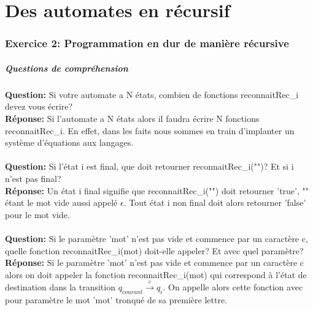 \documentclass[./standalone.tex]{subfiles}
\begin{document}
\part{Des automates en récursif}

\section{Exercice 2: Programmation en dur de manière récursive}
\bigskip

\subsubsection{Questions de compréhension}
\medskip

\textbf{Question:} Si votre automate a N états, combien de fonctions reconnaitRec\_i devez vous écrire?\\

\textbf{Réponse:} Si l'automate a N états alors il faudra écrire N fonctions reconnaitRec\_i. En effet, dans les faits nous sommes en train d'implanter un système d'équations aux langages.\\\\


\textbf{Question:} Si l'état i est final, que doit retourner reconnaitRec\_i("")? Et si i n'est pas final?\\

\textbf{Réponse:} Un état i final signifie que reconnaitRec\_i("") doit retourner 'true', "" étant le mot vide aussi appelé $\epsilon$. Tout état i non final doit alors retourner 'false' pour le mot vide.\\\\


\textbf{Question:} Si le paramètre 'mot' n'est pas vide et commence par un caractère c, quelle fonction reconnaitRec\_i(mot) doit-elle appeler? Et avec quel paramètre?\\

\textbf{Réponse:} Si le paramètre 'mot' n'est pas vide et commence par un caractère c alors on doit appeler la fonction reconnaitRec\_i(mot) qui correspond à l'état de destination dans la transition $q_{courant} \xrightarrow{c}  q_i$. On appelle alors cette fonction avec pour paramètre le mot 'mot' tronqué de sa première lettre.\\\\
\end{document}
